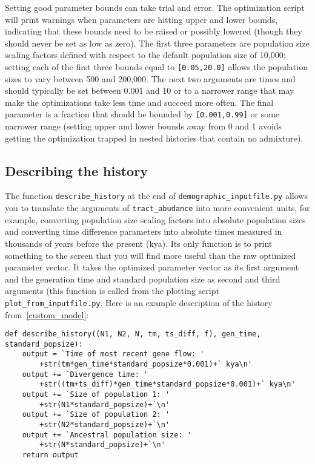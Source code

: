 \documentclass[12pt]{article}
\begin{document}
Setting good parameter bounds can take trial and error. The optimization script will print warnings when parameters are hitting upper and lower bounds, indicating that these bounds need to be raised or possibly lowered (though they should never be set as low as zero). The first three parameters are population size scaling factors defined with respect to the default population size of 10,000; setting each of the first three bounds equal to \verb|[0.05,20.0]| allows the population sizes to vary between 500 and 200,000. The next two arguments are times and should typically be set between 0.001 and 10 or to a narrower range that may make the optimizations take less time and succeed more often. The final parameter is a fraction that should be bounded by \verb|[0.001,0.99]| or some narrower range (setting upper and lower bounds away from 0 and 1 avoids getting the optimization trapped in nested histories that contain no admixture).

\subsection{Describing the history}

The function \verb|describe_history| at the end of \verb|demographic_inputfile.py| allows you to translate the arguments of \verb|tract_abudance| into more convenient units, for example, converting population size scaling factors into absolute population sizes and converting time difference parameters into absolute times measured in thousands of years before the present (kya). Its only function is to print something to the screen that you will find more useful than the raw optimized parameter vector. It takes the optimized parameter vector as its first argument and the generation time and standard population size as second and third arguments (this function is called from the plotting script \verb|plot_from_inputfile.py|. Here is an example description of the history from~\ref{custom_model}:

\begin{Verbatim}
def describe_history((N1, N2, N, tm, ts_diff, f), gen_time, standard_popsize):
    output = `Time of most recent gene flow: '
    	+str(tm*gen_time*standard_popsize*0.001)+` kya\n'
    output += `Divergence time: '
    	+str((tm+ts_diff)*gen_time*standard_popsize*0.001)+` kya\n'
    output += `Size of population 1: '
    	+str(N1*standard_popsize)+`\n'
    output += `Size of population 2: '
    	+str(N2*standard_popsize)+`\n'
    output += `Ancestral population size: '
    	+str(N*standard_popsize)+`\n'
    return output
\end{Verbatim}
\end{document}
